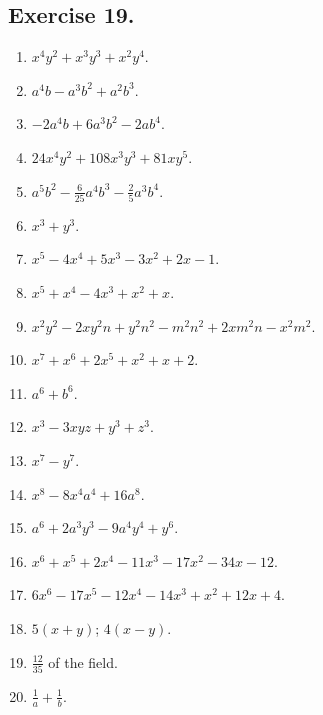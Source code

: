 \documentclass{book}
\begin{document}
\subsection*{Exercise 19.} \begin{enumerate}

\item $x^4y^2 + x^3y^3 + x^2y^4$.

\item $a^4b - a^3b^2 +a^2b^3$.

\item $-2a^4b + 6a^3b^2 - 2ab^4$.

\item $24x^4y^2 + 108x^3y^3 + 81xy^5$.

\item $a^5b^2 - \frac{6}{25}a^4b^3 - \frac{2}{5}a^3b^4$.

\item $x^3 + y^3$.

\item $x^5 - 4x^4 + 5x^3 - 3x^2 + 2x - 1$.

\item $x^5 + x^4 - 4x^3 + x^2 + x$.

\item $x^2y^2 - 2xy^2n + y^2n^2 - m^2n^2 + 2xm^2n - x^2m^2$.

\item $x^7 + x^6 + 2x^5 + x^2 + x + 2$.

\item $a^6 + b^6$.

\item $x^3 - 3xyz + y^3 + z^3$.

\item $x^7 - y^7$.

\item $x^8 - 8x^4a^4 + 16a^8$.

\item $a^6 + 2a^3y^3 - 9a^4y^4 + y^6$.

\item $x^6 + x^5 + 2x^4 - 11x^3 - 17x^2 - 34x - 12$.

\item $6x^6 - 17x^5 - 12x^4 - 14x^3 + x^2 + 12x + 4$.

\item $5(x + y)$; $4(x - y)$.

\item $\frac{12}{35}$ of the field.

\item $\frac{1}{a} + \frac{1}{b}$.
\end{enumerate}
\end{document}
